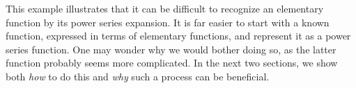 This example illustrates that it can be difficult to recognize an elementary function by its power series expansion. It is far easier to start with a known function, expressed in terms of elementary functions, and represent it as a power series function. One may wonder why we would bother doing so, as the latter function probably seems more complicated. In the next two sections, we show both \emph{how} to do this and  \emph{why} such a process can be beneficial.






